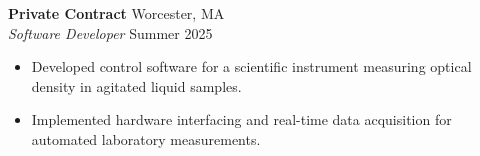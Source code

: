 \textbf{Private Contract} \hfill Worcester, MA\\
\textit{Software Developer} \hfill Summer 2025
\begin{itemize}
  \item Developed control software for a scientific instrument measuring optical density in agitated liquid samples.
  \item Implemented hardware interfacing and real-time data acquisition for automated laboratory measurements.
\end{itemize}
